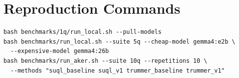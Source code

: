 \chapter{Reproduction Commands}
\begin{lstlisting}
bash benchmarks/1q/run_local.sh --pull-models
bash benchmarks/run_local.sh --suite 5q --cheap-model gemma4:e2b \
  --expensive-model gemma4:26b
bash benchmarks/run_aker.sh --suite 10q --repetitions 10 \
  --methods "suql_baseline suql_v1 trummer_baseline trummer_v1"
\end{lstlisting}
